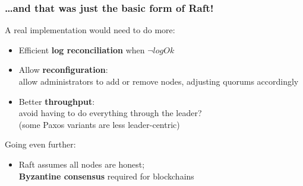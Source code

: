 \begin{frame}
    \label{s:raft-end}
    \frametitle{{\dots}and that was just the basic form of Raft!}
    A real implementation would need to do more:
    \begin{itemize}
        \item Efficient \textbf{log reconciliation} when $\neg\mathit{logOk}$
        \item Allow \textbf{reconfiguration}:\\ allow administrators to add or remove nodes, adjusting quorums accordingly
        \item Better \textbf{throughput}:\\ avoid having to do everything through the leader? \\
            (some Paxos variants are less leader-centric) \pause\\[1em]
    \end{itemize}
    Going even further:
    \begin{itemize}
        \item Raft assumes all nodes are honest;\\
            \textbf{Byzantine consensus} required for blockchains
    \end{itemize}
\end{frame}
\label{l:raft-end}

